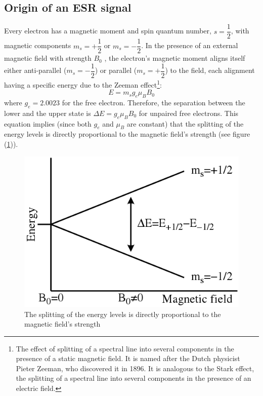 \documentclass[%
 reprint,
nofootinbib,
 amsmath,amssymb,
 aps,
floatfix,
]{revtex4-2}
\begin{document}
    \subsection{Origin of an ESR signal}
    Every electron has a magnetic moment and spin quantum number, $s = \dfrac{1}{2}$, with magnetic components $m_s = + \dfrac{1}{2}$ or $m_s = - \dfrac{1}{2}$. In the presence of an external magnetic field with strength $B_0$ , the electron's magnetic moment aligns itself either anti-parallel ($m_s = - \dfrac{1}{2}$) or parallel ($m_s = + \dfrac{1}{2}$) to the field, each alignment having a specific energy due to the Zeeman effect\footnote{The effect of splitting of a spectral line into several components in the presence of a static magnetic field. It is named after the Dutch physicist Pieter Zeeman, who discovered it in 1896. It is analogous to the Stark effect, the splitting of a spectral line into several components in the presence of an electric field.}:
    \begin{equation}
        E = m_s g_e \mu_B B_0
    \end{equation}
    where $g_e = 2.0023$ for the free electron. Therefore, the separation between the lower and the upper state is $\Delta E = g_e \mu_B B_0$ for unpaired free electrons. This equation implies (since both $g_e$ and $\mu_B$ are constant) that the splitting of the energy levels is directly proportional to the magnetic field's strength (see figure (\ref{fig:ESRsplit})).
    \begin{figure}
        \centering
        \includegraphics[scale = 0.4]{Figures/EPR_splitting.svg.png}
        \caption{The splitting of the energy levels is directly proportional to the magnetic field's strength}
        \label{fig:ESRsplit}
    \end{figure}
\end{document}
